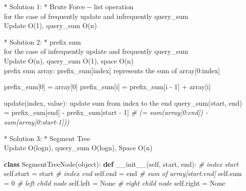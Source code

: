 \documentclass[11pt]{article}
\newenvironment{Shaded}{}{}
\newcommand{\KeywordTok}[1]{\textcolor[rgb]{0.00,0.44,0.13}{\textbf{{#1}}}}
\newcommand{\DecValTok}[1]{\textcolor[rgb]{0.25,0.63,0.44}{{#1}}}
\newcommand{\CommentTok}[1]{\textcolor[rgb]{0.38,0.63,0.69}{\textit{{#1}}}}
\newcommand{\FunctionTok}[1]{\textcolor[rgb]{0.02,0.16,0.49}{{#1}}}
\newcommand{\NormalTok}[1]{{#1}}
\newcommand{\ImportTok}[1]{{#1}}
\newcommand{\VariableTok}[1]{\textcolor[rgb]{0.10,0.09,0.49}{{#1}}}
\newcommand{\OperatorTok}[1]{\textcolor[rgb]{0.40,0.40,0.40}{{#1}}}
\newcommand{\BuiltInTok}[1]{{#1}}
\begin{document}
     * Solution 1: * Brute Force -\/- list operation\\
for the case of frequently update and infrequently query\_sum\\
Update O(1), query\_sum O(n)

 * Solution 2: * prefix sum\\
for the case of infrequently update and frequently query\_sum\\
Update O(n), query\_sum O(1), space O(n)\\
prefix sum array: prefix\_sum{[}index{]} represents the sum of
array{[}0:index{]}

\begin{Shaded}
\begin{Highlighting}[]
\NormalTok{prefix_sum[}\DecValTok{0}\NormalTok{] }\OperatorTok{=}\NormalTok{ array[}\DecValTok{0}\NormalTok{]}
\NormalTok{prefix_sum[i] }\OperatorTok{=}\NormalTok{ prefix_sum[i }\OperatorTok{-} \DecValTok{1}\NormalTok{] }\OperatorTok{+}\NormalTok{ array[i]}

\NormalTok{update(index, value): update }\BuiltInTok{sum} \ImportTok{from}\NormalTok{ index to the end}
\NormalTok{query_sum(start, end) }\OperatorTok{=}\NormalTok{ prefix_sum[end] }\OperatorTok{-}\NormalTok{ prefix_sum[start }\OperatorTok{-} \DecValTok{1}\NormalTok{] }\CommentTok{# (= sum(array[0:end]) - sum(array[0:start-1]))}
\end{Highlighting}
\end{Shaded}

 * Solution 3: * Segment Tree\\
Update O(logn), query\_sum O(logn), Space O(n)

\begin{Shaded}
\begin{Highlighting}[]
\KeywordTok{class}\NormalTok{ SegmentTreeNode(}\BuiltInTok{object}\NormalTok{):}
    \KeywordTok{def} \FunctionTok{__init__}\NormalTok{(}\VariableTok{self}\NormalTok{, start, end):}
        \CommentTok{# index start}
        \VariableTok{self}\NormalTok{.start }\OperatorTok{=}\NormalTok{ start}
        \CommentTok{# index end}
        \VariableTok{self}\NormalTok{.end }\OperatorTok{=}\NormalTok{ end}
        \CommentTok{# sum of array[start:end]}
        \VariableTok{self}\NormalTok{.}\BuiltInTok{sum} \OperatorTok{=} \DecValTok{0}
        \CommentTok{# left child node}
        \VariableTok{self}\NormalTok{.left }\OperatorTok{=} \VariableTok{None}
        \CommentTok{# right child node}
        \VariableTok{self}\NormalTok{.right }\OperatorTok{=} \VariableTok{None}
\end{Highlighting}
\end{Shaded}
\end{document}
